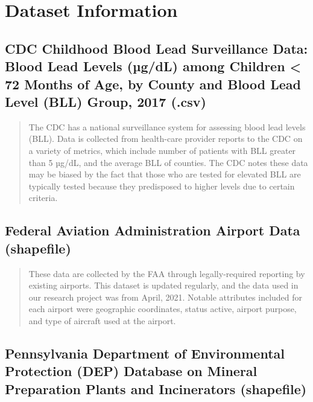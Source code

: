 \documentclass[
  12pt,
]{article}
\begin{document}
\newpage

\hypertarget{dataset-information}{%
\section{Dataset Information}\label{dataset-information}}

\hypertarget{cdc-childhood-blood-lead-surveillance-data-blood-lead-levels-uxb5gdl-among-children-72-months-of-age-by-county-and-blood-lead-level-bll-group-2017-.csv}{%
\subsection{CDC Childhood Blood Lead Surveillance Data: Blood Lead
Levels (µg/dL) among Children \textless{} 72 Months of Age, by County
and Blood Lead Level (BLL) Group, 2017
(.csv)}\label{cdc-childhood-blood-lead-surveillance-data-blood-lead-levels-uxb5gdl-among-children-72-months-of-age-by-county-and-blood-lead-level-bll-group-2017-.csv}}

\begin{quote}
The CDC has a national surveillance system for assessing blood lead
levels (BLL). Data is collected from health-care provider reports to the
CDC on a variety of metrics, which include number of patients with BLL
greater than 5 µg/dL, and the average BLL of counties. The CDC notes
these data may be biased by the fact that those who are tested for
elevated BLL are typically tested because they predisposed to higher
levels due to certain criteria.
\end{quote}

\hypertarget{federal-aviation-administration-airport-data-shapefile}{%
\subsection{Federal Aviation Administration Airport Data
(shapefile)}\label{federal-aviation-administration-airport-data-shapefile}}

\begin{quote}
These data are collected by the FAA through legally-required reporting
by existing airports. This dataset is updated regularly, and the data
used in our research project was from April, 2021. Notable attributes
included for each airport were geographic coordinates, status active,
airport purpose, and type of aircraft used at the airport.
\end{quote}

\hypertarget{pennsylvania-department-of-environmental-protection-dep-database-on-mineral-preparation-plants-and-incinerators-shapefile}{%
\subsection{Pennsylvania Department of Environmental Protection (DEP)
Database on Mineral Preparation Plants and Incinerators
(shapefile)}\label{pennsylvania-department-of-environmental-protection-dep-database-on-mineral-preparation-plants-and-incinerators-shapefile}}
\end{document}
